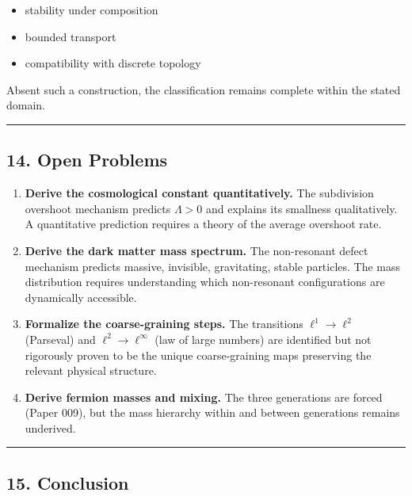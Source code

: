 \documentclass[
]{article}
\providecommand{\tightlist}{%
  \setlength{\itemsep}{0pt}\setlength{\parskip}{0pt}}
\begin{document}
\begin{itemize}
\tightlist
\item
  stability under composition
\item
  bounded transport
\item
  compatibility with discrete topology
\end{itemize}

Absent such a construction, the classification remains complete within
the stated domain.

\begin{center}\rule{0.5\linewidth}{0.5pt}\end{center}

\subsection{14. Open Problems}\label{open-problems}

\begin{enumerate}
\def\labelenumi{\arabic{enumi}.}
\item
  \textbf{Derive the cosmological constant quantitatively.} The
  subdivision overshoot mechanism predicts \(\Lambda > 0\) and explains
  its smallness qualitatively. A quantitative prediction requires a
  theory of the average overshoot rate.
\item
  \textbf{Derive the dark matter mass spectrum.} The non-resonant defect
  mechanism predicts massive, invisible, gravitating, stable particles.
  The mass distribution requires understanding which non-resonant
  configurations are dynamically accessible.
\item
  \textbf{Formalize the coarse-graining steps.} The transitions
  \(\ell^1 \to \ell^2\) (Parseval) and \(\ell^2 \to \ell^\infty\) (law
  of large numbers) are identified but not rigorously proven to be the
  unique coarse-graining maps preserving the relevant physical
  structure.
\item
  \textbf{Derive fermion masses and mixing.} The three generations are
  forced (Paper 009), but the mass hierarchy within and between
  generations remains underived.
\end{enumerate}

\begin{center}\rule{0.5\linewidth}{0.5pt}\end{center}

\subsection{15. Conclusion}\label{conclusion}
\end{document}
